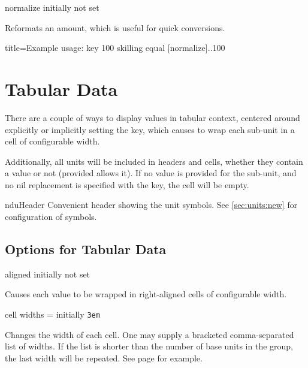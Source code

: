 \documentclass[
	a4paper,
]{article}
\begin{document}
\begin{docKey}
	{normalize}
	{}
	{initially not set}

Reformats an amount, which is useful for quick conversions.

\begin{dispExample*}{
	title=Example usage:  key
}
100 skilling equal
[normalize]{..100} %
\end{dispExample*}
\end{docKey}

\clearpage
\section{Tabular Data} %

There are a couple of ways to display values in tabular context, centered around explicitly or implicitly setting the  key, which causes  to wrap each sub-unit in a cell of configurable width.

Additionally, all units will be included in headers and cells, whether they contain a value or not (provided  allows it). If no value is provided for the sub-unit, and no nil replacement is specified with the  key, the cell will be empty.

\begin{docCommand}
	{nduHeader}
	{}
	Convenient header showing the unit symbols. See \cref{sec:units:new} for configuration of symbols.
\end{docCommand}

\subsection{Options for Tabular Data}

\begin{docKey}
	{aligned}
	{}
	{initially not set}

Causes each value to be wrapped in right-aligned cells of configurable width.
\end{docKey}

\begin{docKey}
	{cell widths}
	{=}
	{initially \texttt{3em}}

Changes the width of each cell. One may supply a bracketed comma-separated list of widths. If the list is shorter than the number of base units in the group, the last width will be repeated. See page  for example.
\end{docKey}
\end{document}
